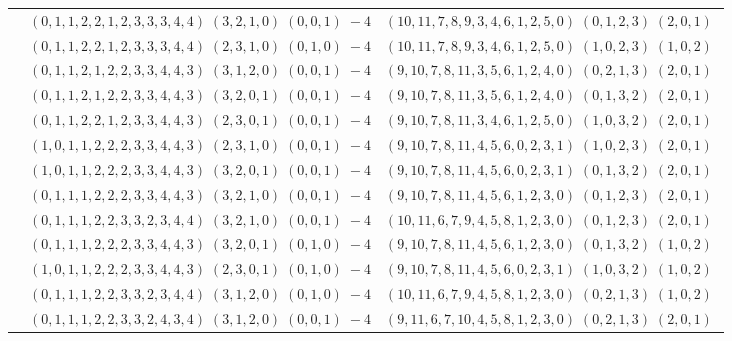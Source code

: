 \documentclass[11pt]{article}
\begin{document}
\begin{longtable}[l]{|c|c|c|}
 \cline{2-3} 
 & $(0 ,1 ,1 ,2 ,2 ,1 ,2 ,3 ,3 ,3 ,4 ,4) \;(3 ,2 ,1 ,0) \;(0 ,0 ,1) \;-4$ & $(10 ,11 ,7 ,8 ,9 ,3 ,4 ,6 ,1 ,2 ,5 ,0) \;(0 ,1 ,2 ,3) \;(2 ,0 ,1) \;$\\ 
 \cline{2-3} 
 & $(0 ,1 ,1 ,2 ,2 ,1 ,2 ,3 ,3 ,3 ,4 ,4) \;(2 ,3 ,1 ,0) \;(0 ,1 ,0) \;-4$ & $(10 ,11 ,7 ,8 ,9 ,3 ,4 ,6 ,1 ,2 ,5 ,0) \;(1 ,0 ,2 ,3) \;(1 ,0 ,2) \;$\\ 
 \cline{2-3} 
 & $(0 ,1 ,1 ,2 ,1 ,2 ,2 ,3 ,3 ,4 ,4 ,3) \;(3 ,1 ,2 ,0) \;(0 ,0 ,1) \;-4$ & $(9 ,10 ,7 ,8 ,11 ,3 ,5 ,6 ,1 ,2 ,4 ,0) \;(0 ,2 ,1 ,3) \;(2 ,0 ,1) \;$\\ 
 \cline{2-3} 
 & $(0 ,1 ,1 ,2 ,1 ,2 ,2 ,3 ,3 ,4 ,4 ,3) \;(3 ,2 ,0 ,1) \;(0 ,0 ,1) \;-4$ & $(9 ,10 ,7 ,8 ,11 ,3 ,5 ,6 ,1 ,2 ,4 ,0) \;(0 ,1 ,3 ,2) \;(2 ,0 ,1) \;$\\ 
 \cline{2-3} 
 & $(0 ,1 ,1 ,2 ,2 ,1 ,2 ,3 ,3 ,4 ,4 ,3) \;(2 ,3 ,0 ,1) \;(0 ,0 ,1) \;-4$ & $(9 ,10 ,7 ,8 ,11 ,3 ,4 ,6 ,1 ,2 ,5 ,0) \;(1 ,0 ,3 ,2) \;(2 ,0 ,1) \;$\\ 
 \cline{2-3} 
 & $(1 ,0 ,1 ,1 ,2 ,2 ,2 ,3 ,3 ,4 ,4 ,3) \;(2 ,3 ,1 ,0) \;(0 ,0 ,1) \;-4$ & $(9 ,10 ,7 ,8 ,11 ,4 ,5 ,6 ,0 ,2 ,3 ,1) \;(1 ,0 ,2 ,3) \;(2 ,0 ,1) \;$\\ 
 \cline{2-3} 
 & $(1 ,0 ,1 ,1 ,2 ,2 ,2 ,3 ,3 ,4 ,4 ,3) \;(3 ,2 ,0 ,1) \;(0 ,0 ,1) \;-4$ & $(9 ,10 ,7 ,8 ,11 ,4 ,5 ,6 ,0 ,2 ,3 ,1) \;(0 ,1 ,3 ,2) \;(2 ,0 ,1) \;$\\ 
 \cline{2-3} 
 & $(0 ,1 ,1 ,1 ,2 ,2 ,2 ,3 ,3 ,4 ,4 ,3) \;(3 ,2 ,1 ,0) \;(0 ,0 ,1) \;-4$ & $(9 ,10 ,7 ,8 ,11 ,4 ,5 ,6 ,1 ,2 ,3 ,0) \;(0 ,1 ,2 ,3) \;(2 ,0 ,1) \;$\\ 
 \cline{2-3} 
 & $(0 ,1 ,1 ,1 ,2 ,2 ,3 ,3 ,2 ,3 ,4 ,4) \;(3 ,2 ,1 ,0) \;(0 ,0 ,1) \;-4$ & $(10 ,11 ,6 ,7 ,9 ,4 ,5 ,8 ,1 ,2 ,3 ,0) \;(0 ,1 ,2 ,3) \;(2 ,0 ,1) \;$\\ 
 \cline{2-3} 
 & $(0 ,1 ,1 ,1 ,2 ,2 ,2 ,3 ,3 ,4 ,4 ,3) \;(3 ,2 ,0 ,1) \;(0 ,1 ,0) \;-4$ & $(9 ,10 ,7 ,8 ,11 ,4 ,5 ,6 ,1 ,2 ,3 ,0) \;(0 ,1 ,3 ,2) \;(1 ,0 ,2) \;$\\ 
 \cline{2-3} 
 & $(1 ,0 ,1 ,1 ,2 ,2 ,2 ,3 ,3 ,4 ,4 ,3) \;(2 ,3 ,0 ,1) \;(0 ,1 ,0) \;-4$ & $(9 ,10 ,7 ,8 ,11 ,4 ,5 ,6 ,0 ,2 ,3 ,1) \;(1 ,0 ,3 ,2) \;(1 ,0 ,2) \;$\\ 
 \cline{2-3} 
 & $(0 ,1 ,1 ,1 ,2 ,2 ,3 ,3 ,2 ,3 ,4 ,4) \;(3 ,1 ,2 ,0) \;(0 ,1 ,0) \;-4$ & $(10 ,11 ,6 ,7 ,9 ,4 ,5 ,8 ,1 ,2 ,3 ,0) \;(0 ,2 ,1 ,3) \;(1 ,0 ,2) \;$\\ 
 \cline{2-3} 
 & $(0 ,1 ,1 ,1 ,2 ,2 ,3 ,3 ,2 ,4 ,3 ,4) \;(3 ,1 ,2 ,0) \;(0 ,0 ,1) \;-4$ & $(9 ,11 ,6 ,7 ,10 ,4 ,5 ,8 ,1 ,2 ,3 ,0) \;(0 ,2 ,1 ,3) \;(2 ,0 ,1) \;$\\ 

\end{longtable}
\end{document}
